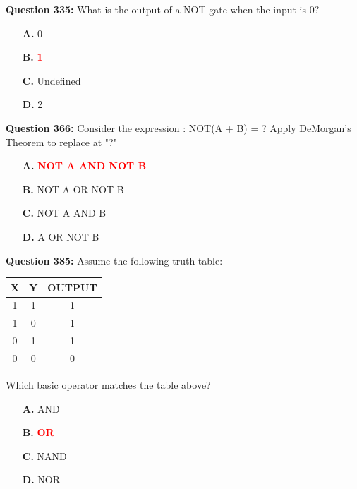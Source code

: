 \documentclass[12pt,a4paper]{article}
\begin{document}
\vspace{0.5cm}

\vspace{0.5cm}

\textbf{Question 335:} What is the output of a NOT gate when the input is 0?

\begin{itemize}
    \item[\textbf{A.}] 0
    \item[\textbf{B.}] \textcolor{red}{\textbf{1}}
    \item[\textbf{C.}] Undefined
    \item[\textbf{D.}] 2
\end{itemize}

\vspace{0.5cm}

\vspace{0.5cm}

\textbf{Question 366:} Consider the expression : NOT(A + B) = ? Apply DeMorgan's Theorem to replace at "?"

\begin{itemize}
    \item[\textbf{A.}] \textcolor{red}{\textbf{NOT A AND NOT B}}
    \item[\textbf{B.}] NOT A OR NOT B
    \item[\textbf{C.}] NOT A AND B
    \item[\textbf{D.}] A OR NOT B
\end{itemize}

\vspace{0.5cm}

\vspace{0.5cm}

\textbf{Question 385:} Assume the following truth table:

\begin{center}
\renewcommand{\arraystretch}{1.3}
\begin{tabular}{|c|c|c|}
\hline
\textbf{X} & \textbf{Y} & \textbf{OUTPUT} \\ \hline
1 & 1 & 1 \\ \hline
1 & 0 & 1 \\ \hline
0 & 1 & 1 \\ \hline
0 & 0 & 0 \\ \hline
\end{tabular}
\end{center}

Which basic operator matches the table above?

\begin{itemize}
    \item[\textbf{A.}] AND
    \item[\textbf{B.}] \textcolor{red}{\textbf{OR}}
    \item[\textbf{C.}] NAND
    \item[\textbf{D.}] NOR
\end{itemize}
\end{document}
